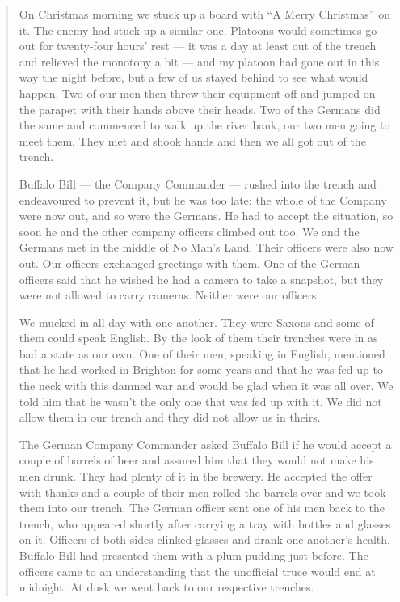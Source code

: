 \begin{quote}
On Christmas morning we stuck up a board with “A Merry Christmas” on it. The enemy had stuck up a similar one. Platoons would sometimes go out for twenty-four hours’ rest — it was a day at least out of the trench and relieved the monotony a bit — and my platoon had gone out in this way the night before, but a few of us stayed behind to see what would happen. Two of our men then threw their equipment off and jumped on the parapet with their hands above their heads. Two of the Germans did the same and commenced to walk up the river bank, our two men going to meet them. They met and shook hands and then we all got out of the trench.

Buffalo Bill — the Company Commander — rushed into the trench and endeavoured to prevent it, but he was too late: the whole of the Company were now out, and so were the Germans. He had to accept the situation, so soon he and the other company officers climbed out too. We and the Germans met in the middle of No Man’s Land. Their officers were also now out. Our officers exchanged greetings with them. One of the German officers said that he wished he had a camera to take a snapshot, but they were not allowed to carry cameras. Neither were our officers.

We mucked in all day with one another. They were Saxons and some of them could speak English. By the look of them their trenches were in as bad a state as our own. One of their men, speaking in English, mentioned that he had worked in Brighton for some years and that he was fed up to the neck with this damned war and would be glad when it was all over. We told him that he wasn’t the only one that was fed up with it. We did not allow them in our trench and they did not allow us in theirs.

The German Company Commander asked Buffalo Bill if he would accept a couple of barrels of beer and assured him that they would not make his men drunk. They had plenty of it in the brewery. He accepted the offer with thanks and a couple of their men rolled the barrels over and we took them into our trench. The German officer sent one of his men back to the trench, who appeared shortly after carrying a tray with bottles and glasses on it. Officers of both sides clinked glasses and drank one another’s health. Buffalo Bill had presented them with a plum pudding just before. The officers came to an understanding that the unofficial truce would end at midnight. At dusk we went back to our respective trenches.


\end{quote}
